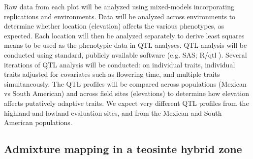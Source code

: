 Raw data from each plot will be analyzed using mixed-models incorporating replications and environments.  Data will be analyzed across environments to determine whether location (elevation) affects the various phenotypes, as expected.  Each location will then be analyzed separately to derive least squares means to be used as the phenotypic data in QTL analyses.  QTL analysis will be conducted using standard, publicly available software (e.g. SAS; R/qtl \citealp{Broman2003a}).  Several iterations of QTL analysis will be conducted: on individual traits, individual traits adjusted for covariates such as flowering time, and multiple traits simultaneously.  The QTL profiles will be compared across populations (Mexican vs South American) and across field sites (elevations) to determine how elevation affects putatively adaptive traits.  We expect very different QTL profiles from the highland and lowland evaluation sites, and from the Mexican and South American populations.


\subsection{Admixture mapping in a teosinte hybrid zone}



